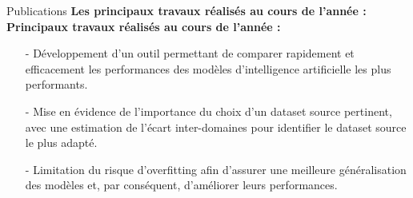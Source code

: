\begin{subsectionframemod}{Publications}
    \textbf{Les principaux travaux réalisés au cours de l'année :}
    \textbf{Principaux travaux réalisés au cours de l'année :}
    \begin{itemize}
        \item[-] Développement d'un outil permettant de comparer rapidement et efficacement les performances des modèles d'intelligence artificielle les plus performants.
        \item[-] Mise en évidence de l'importance du choix d'un dataset source pertinent, avec une estimation de l'écart inter-domaines pour identifier le dataset source le plus adapté.
        \item[-] Limitation du risque d'overfitting afin d'assurer une meilleure généralisation des modèles et, par conséquent, d'améliorer leurs performances.
    \end{itemize}

\end{subsectionframemod}

